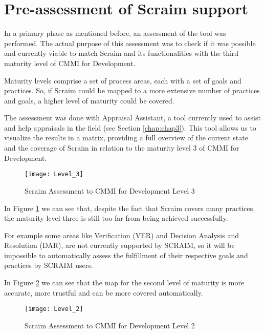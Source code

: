 \section{Pre-assessment of Scraim support} \label{sec:preassessment}

In a primary phase as mentioned before, an assessment of the tool was performed. The actual purpose of this assessment was to check if it was possible and currently viable to match Scraim and its functionalities with the third maturity level of CMMI for Development.

Maturity levels comprise a set of process areas, each with a set of goals and practices. So, if Scraim could be mapped to a more extensive number of practices and goals, a higher level of maturity could be covered.

The assessment was done with Appraisal Assistant, a tool currently used to assist and help appraisals in the field (see Section \ref{chap:chap3}). This tool allows us to visualize the results in a matrix, providing a full overview of the current state and the coverage of Scraim in relation to the maturity level 3 of CMMI for Development.


\begin{figure}[h]
	\begin{center}
		\leavevmode
		\texttt{[image: Level\_3]}
		\caption{Scraim Assessment to CMMI for Development Level 3}
		\label{fig:level3}
	\end{center}
\end{figure}

In Figure \ref{fig:level3} we can see that, despite the fact that Scraim covers many practices, the maturity level three is still too far from being achieved successfully.

For example some areas like Verification (VER) and Decision Analysis and Resolution (DAR), are not currently supported by SCRAIM, so it will be impossible to automatically assess the fulfillment of their respective goals and practices by SCRAIM users.

In Figure \ref{fig:level2} we can see that the map for the second level of maturity is more accurate, more trustful and can be more covered automatically.
	
\begin{figure}[h]
	\begin{center}
		\leavevmode
		\texttt{[image: Level\_2]}
		\caption{Scraim Assessment to CMMI for Development Level 2}
		\label{fig:level2}
	\end{center}
\end{figure}

